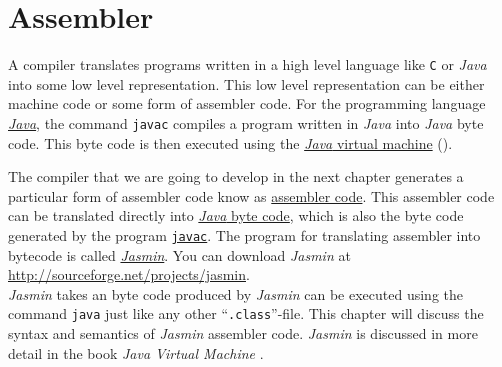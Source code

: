\chapter{Assembler}
A compiler translates programs written in a high level language like \texttt{C} or
\textsl{Java} into some low level representation.  This low level representation can be
either machine code or some form of assembler code.  For the programming language
\href{https://en.wikipedia.org/wiki/Java_(programming_language)}{\textsl{Java}}, 
the command \texttt{javac} compiles a program written in \textsl{Java} into
\textsl{Java} byte code.  This byte code is then executed using the 
\href{http://en.wikipedia.org/wiki/Java_virtual_machine}{\textsl{Java} virtual machine}
().

The compiler that we are going to
develop in the next chapter generates a particular form of assembler code know as
\href{http://jasmin.sourceforge.net}{ assembler code}.
This assembler code can be translated directly into
\href{http://en.wikipedia.org/wiki/Java_bytecode}{\textsl{Java} byte code}, which 
is also the byte code generated by the program \href{https://en.wikipedia.org/wiki/javac}{\texttt{javac}}.  The
program for translating  
assembler into bytecode is called \href{http://jasmin.sourceforge.net}{\textsl{Jasmin}}.
You can download \textsl{Jasmin} at
\\[0.2cm]
\hspace*{1.3cm}
\href{http://sourceforge.net/projects/jasmin}{http://sourceforge.net/projects/jasmin}.
\\[0.2cm]
\textsl{Jasmin} takes an byte code produced by \textsl{Jasmin} can be executed using the
command  \texttt{java} just like any other ``\texttt{.class}''-file.  
This chapter will discuss the syntax and semantics of
\textsl{Jasmin} assembler code.  \textsl{Jasmin} is discussed in more detail in the book
\textsl{Java Virtual Machine} \cite{meyer:1997}. 

